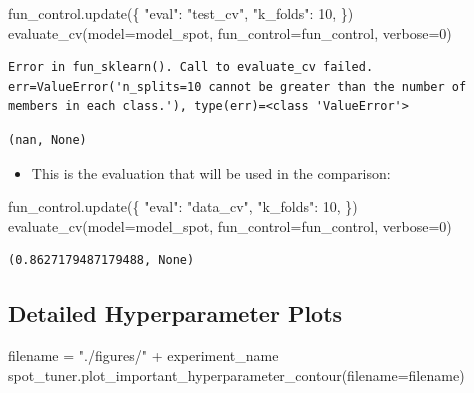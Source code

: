 \documentclass[
  letterpaper,
  DIV=11,
  numbers=noendperiod]{scrreprt}
\newenvironment{Shaded}{\begin{snugshade}}{\end{snugshade}}
\newcommand{\DecValTok}[1]{\textcolor[rgb]{0.68,0.00,0.00}{#1}}
\newcommand{\NormalTok}[1]{\textcolor[rgb]{0.00,0.23,0.31}{#1}}
\newcommand{\OperatorTok}[1]{\textcolor[rgb]{0.37,0.37,0.37}{#1}}
\newcommand{\StringTok}[1]{\textcolor[rgb]{0.13,0.47,0.30}{#1}}
\providecommand{\tightlist}{%
  \setlength{\itemsep}{0pt}\setlength{\parskip}{0pt}}\usepackage{longtable,booktabs,array}
\begin{document}
\begin{Shaded}
\begin{Highlighting}[]
\NormalTok{fun\_control.update(\{}
     \StringTok{"eval"}\NormalTok{: }\StringTok{"test\_cv"}\NormalTok{,}
     \StringTok{"k\_folds"}\NormalTok{: }\DecValTok{10}\NormalTok{,}
\NormalTok{\})}
\NormalTok{evaluate\_cv(model}\OperatorTok{=}\NormalTok{model\_spot, fun\_control}\OperatorTok{=}\NormalTok{fun\_control, verbose}\OperatorTok{=}\DecValTok{0}\NormalTok{)}
\end{Highlighting}
\end{Shaded}

\begin{verbatim}
Error in fun_sklearn(). Call to evaluate_cv failed. err=ValueError('n_splits=10 cannot be greater than the number of members in each class.'), type(err)=<class 'ValueError'>
\end{verbatim}

\begin{verbatim}
(nan, None)
\end{verbatim}

\begin{itemize}
\tightlist
\item
  This is the evaluation that will be used in the comparison:
\end{itemize}

\begin{Shaded}
\begin{Highlighting}[]
\NormalTok{fun\_control.update(\{}
     \StringTok{"eval"}\NormalTok{: }\StringTok{"data\_cv"}\NormalTok{,}
     \StringTok{"k\_folds"}\NormalTok{: }\DecValTok{10}\NormalTok{,}
\NormalTok{\})}
\NormalTok{evaluate\_cv(model}\OperatorTok{=}\NormalTok{model\_spot, fun\_control}\OperatorTok{=}\NormalTok{fun\_control, verbose}\OperatorTok{=}\DecValTok{0}\NormalTok{)}
\end{Highlighting}
\end{Shaded}

\begin{verbatim}
(0.8627179487179488, None)
\end{verbatim}

\hypertarget{detailed-hyperparameter-plots-1}{%
\subsection{Detailed Hyperparameter
Plots}\label{detailed-hyperparameter-plots-1}}

\begin{Shaded}
\begin{Highlighting}[]
\NormalTok{filename }\OperatorTok{=} \StringTok{"./figures/"} \OperatorTok{+}\NormalTok{ experiment\_name}
\NormalTok{spot\_tuner.plot\_important\_hyperparameter\_contour(filename}\OperatorTok{=}\NormalTok{filename)}
\end{Highlighting}
\end{Shaded}
\end{document}
